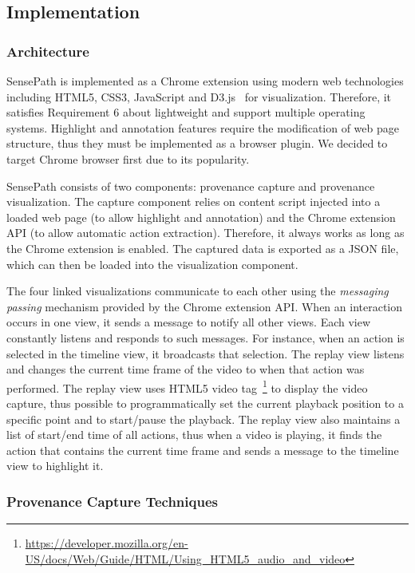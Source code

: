 \subsection{Implementation}
\label{sub:sp-impl}
\subsubsection{Architecture}
SensePath is implemented as a Chrome extension using modern web technologies including HTML5, CSS3, JavaScript and D3.js~\cite{Bostock2011} for visualization. Therefore, it satisfies Requirement 6 about lightweight and support multiple operating systems. Highlight and annotation features require the modification of web page structure, thus they must be implemented as a browser plugin. We decided to target Chrome browser first due to its popularity.

SensePath consists of two components: provenance capture and provenance visualization. The capture component relies on content script injected into a loaded web page (to allow highlight and annotation) and the Chrome extension API (to allow automatic action extraction). Therefore, it always works as long as the Chrome extension is enabled. The captured data is exported as a JSON file, which can then be loaded into the visualization component.

The four linked visualizations communicate to each other using the \textit{messaging passing} mechanism provided by the Chrome extension API. When an interaction occurs in one view, it sends a message to notify all other views. Each view constantly listens and responds to such messages. For instance, when an action is selected in the timeline view, it broadcasts that selection. The replay view listens and changes the current time frame of the video to when that action was performed. The replay view uses HTML5 video tag~\footnote{\url{https://developer.mozilla.org/en-US/docs/Web/Guide/HTML/Using_HTML5_audio_and_video}} to display the video capture, thus possible to programmatically set the current playback position to a specific point and to start/pause the playback. The replay view also maintains a list of start/end time of all actions, thus when a video is playing, it finds the action that contains the current time frame and sends a message to the timeline view to highlight it.

\subsubsection{Provenance Capture Techniques}

